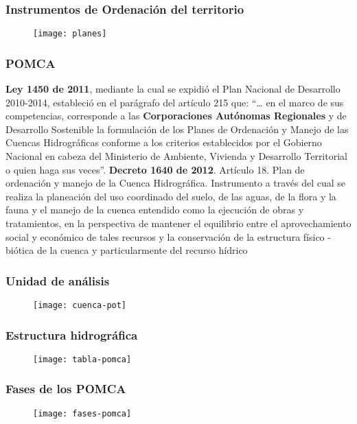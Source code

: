 \documentclass[12pt]{beamer}
\begin{document}
\begin{frame}
\frametitle{Instrumentos de Ordenación del territorio}
\begin{figure}
\centering
\texttt{[image: planes]}
\end{figure}
\end{frame}
\begin{frame}
\frametitle{POMCA}
\justifying
\scriptsize{
\textbf{Ley 1450 de 2011}, mediante la cual se expidió el Plan Nacional de Desarrollo 2010-2014, estableció en el parágrafo del artículo 215 que: “… en el marco de sus competencias, corresponde a las \textbf{Corporaciones Autónomas Regionales} y de Desarrollo Sostenible la formulación de los Planes de Ordenación y Manejo de las Cuencas Hidrográficas conforme a los criterios establecidos por el Gobierno Nacional en cabeza del Ministerio de Ambiente, Vivienda y Desarrollo Territorial o quien haga sus veces”. 
\vfill
\textbf{Decreto 1640 de 2012}. Artículo 18. Plan de ordenación y manejo de la Cuenca Hidrográfica. Instrumento a través del cual se realiza la planeación del uso coordinado del suelo, de las aguas, de la flora y la fauna y el manejo de la cuenca entendido como la ejecución de obras y tratamientos, en la perspectiva de mantener el equilibrio entre el aprovechamiento social y económico de tales recursos y la conservación de la estructura físico -biótica de la cuenca y particularmente del recurso hídrico 
}
\end{frame}
\begin{frame}
\frametitle{Unidad de análisis}
\begin{figure}
\centering
\texttt{[image: cuenca-pot]}
\end{figure}
\end{frame}
\begin{frame}
\frametitle{Estructura hidrográfica}
\begin{figure}
\centering
\texttt{[image: tabla-pomca]}
\end{figure}
\end{frame}
\begin{frame}
\frametitle{Fases de los POMCA}
\begin{figure}
\centering
\texttt{[image: fases-pomca]}
\end{figure}
\end{frame}
\end{document}
